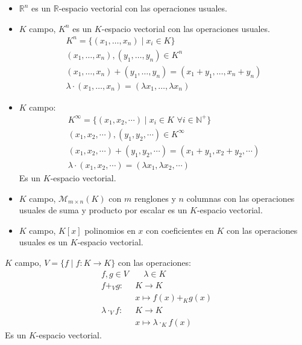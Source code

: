 \begin{example}{}{}
    \begin{itemize}
        \item $\mathbb{R}^n$ es un $\mathbb{R}$-espacio vectorial con las operaciones usuales.
        \item $K$ campo, $K^n$ es un $K$-espacio vectorial con las operaciones usuales.
        \begin{align*}
            K^n = \{(x_1,\dots,x_n) \mid x_i \in K\} \\
            (x_1,\dots,x_n), (y_1,\dots,y_n) \in K^n \\
            (x_1,\dots,x_n) + (y_1,\dots,y_n) = (x_1+y_1,\dots,x_n+y_n) \\
            \lambda \cdot (x_1,\dots,x_n) = (\lambda x_1,\dots,\lambda x_n)
        \end{align*}

        \item $K$ campo:
        \begin{align*}
            K^{\infty} = \{(x_1, x_2, \cdots) \mid x_i \in K \, \, \forall i \in \mathbb{N}^{+}\} \\
            (x_1, x_2, \cdots), (y_1, y_2, \cdots) \in K^{\infty} \\
            (x_1, x_2, \cdots) + (y_1, y_2, \cdots) = (x_1+y_1, x_2+y_2, \cdots) \\
            \lambda \cdot (x_1, x_2, \cdots) = (\lambda x_1, \lambda x_2, \cdots)
        \end{align*} 
        Es un $K$-espacio vectorial.

        \item $K$ campo, $\mathcal{M}_{m\times n}(K)$ con $m$ renglones y $n$ columnas con las operaciones usuales de suma y producto por escalar es un $K$-espacio vectorial.

        \item $K$ campo, $K[x]$ polinomios en $x$ con coeficientes en $K$ con las operaciones usuales es un $K$-espacio vectorial.
    \end{itemize}

\end{example}

\begin{example}{}{}
    $K$ campo, $V = \{f \mid f: K \rightarrow K\}$ con las operaciones:
    \begin{align*}
        f,g \in V &\quad \lambda \in K \\
        f +_V g:& K \rightarrow K \\
        & x \mapsto f(x) +_K g(x) \\
        \lambda \cdot_V f:& K \rightarrow K \\
        & x \mapsto \lambda \cdot_K f(x)
    \end{align*}
    Es un $K$-espacio vectorial.
\end{example}

